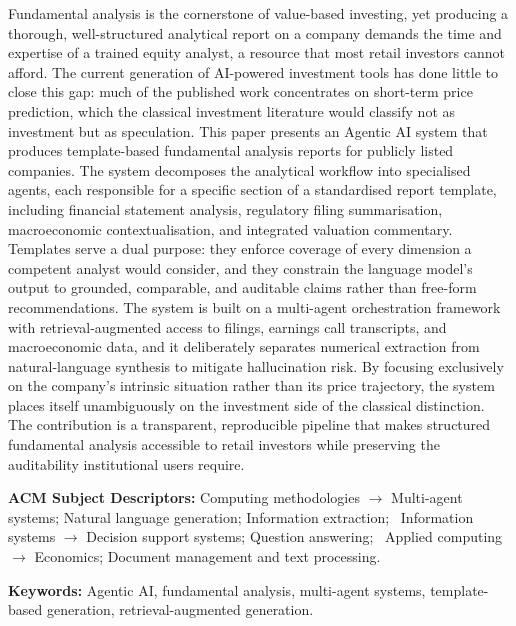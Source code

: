 \documentclass[english,master]{thesis}
\begin{document}
\begin{abstractstyle}{\hsummary}

Fundamental analysis is the cornerstone of value-based investing, yet producing a thorough, well-structured analytical report on a company demands the time and expertise of a trained equity analyst, a resource that most retail investors cannot afford. The current generation of AI-powered investment tools has done little to close this gap: much of the published work concentrates on short-term price prediction, which the classical investment literature would classify not as investment but as speculation. This paper presents an Agentic AI system that produces template-based fundamental analysis reports for publicly listed companies. The system decomposes the analytical workflow into specialised agents, each responsible for a specific section of a standardised report template, including financial statement analysis, regulatory filing summarisation, macroeconomic contextualisation, and integrated valuation commentary. Templates serve a dual purpose: they enforce coverage of every dimension a competent analyst would consider, and they constrain the language model's output to grounded, comparable, and auditable claims rather than free-form recommendations. The system is built on a multi-agent orchestration framework with retrieval-augmented access to filings, earnings call transcripts, and macroeconomic data, and it deliberately separates numerical extraction from natural-language synthesis to mitigate hallucination risk. By focusing exclusively on the company's intrinsic situation rather than its price trajectory, the system places itself unambiguously on the investment side of the classical distinction. The contribution is a transparent, reproducible pipeline that makes structured fundamental analysis accessible to retail investors while preserving the auditability institutional users require. 

    \vspace{1cm}

    \textbf{ACM Subject Descriptors:} Computing methodologies $\rightarrow$ Multi-agent systems; Natural language generation; Information extraction; \textbullet~Information systems $\rightarrow$ Decision support systems; Question answering; \textbullet~Applied computing $\rightarrow$ Economics; Document management and text processing.

    \textbf{Keywords:} Agentic AI, fundamental analysis, multi-agent systems, template-based generation, retrieval-augmented generation.
\end{abstractstyle}
\end{document}
